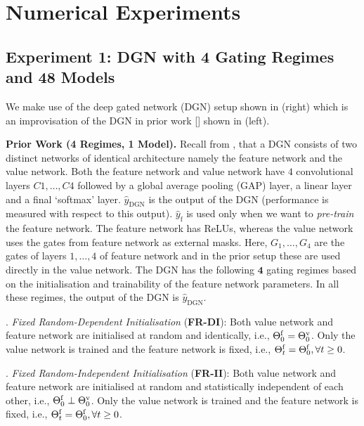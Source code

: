 \section{Numerical Experiments}\label{sec:exp} 
 

\subsection{Experiment 1: DGN with 4 Gating Regimes and 48 Models}
We make use of the deep gated network (DGN) setup shown in  (right) which is an improvisation of the DGN in prior work [] shown in  (left). 

\textbf{Prior Work (4 Regimes, 1 Model).} 
Recall from , that a DGN consists of two distinct networks of identical architecture namely the feature network and the value network. Both the feature network and value network have $4$ convolutional layers $C1,\ldots,C4$ followed by a global average pooling (GAP) layer, a linear layer and a final `softmax' layer. $\hat{y}_{\text{DGN}}$ is the output of the DGN (performance is measured with respect to this output). $\hat{y}_{\text{f}}$ is used only when we want to \emph{pre-train} the feature network. The feature network has ReLUs, whereas the value network uses the gates from feature network as external masks. Here, $G_1,\ldots,G_4$ are the gates of layers $1,\ldots,4$ of feature network and in the prior setup these are used directly in the value network. The DGN has the following $\mathbf{4}$ {gating regimes} based on the initialisation and trainability of the feature network parameters. In all these regimes, the output of the DGN is $\hat{y}_{\text{DGN}}$. 

. \emph{Fixed Random-Dependent Initialisation} (\textbf{FR-DI}): Both value network and feature network are initialised at random and identically, i.e., $\Theta^{\textrm{f}}_0={\Theta}^{\text{v}}_0$. Only the value network is trained and the feature network is fixed, i.e., $\Theta^{\textrm{f}}_t=\Theta^{\textrm{f}}_0,\forall t\geq 0$.

. \emph{Fixed Random-Independent Initialisation} (\textbf{FR-II}): Both value network and feature network are initialised at random and statistically independent of each other, i.e., $\Theta^{\textrm{f}}_0\perp {\Theta}^{\text{v}}_0$. Only the value network is trained and the feature network is fixed, i.e., $\Theta^{\textrm{f}}_t=\Theta^{\textrm{f}}_0,\forall t\geq 0$.

